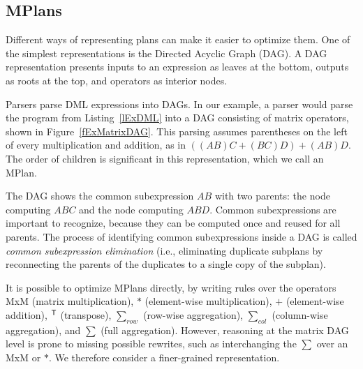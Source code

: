 \subsection{MPlans}
Different ways of representing plans can make it easier to optimize them.
One of the simplest representations is the Directed Acyclic Graph (DAG).
A DAG representation presents inputs to an expression as leaves at the bottom, outputs as roots at the top, and operators as interior nodes.

Parsers parse DML expressions into DAGs.
In our example, a parser would parse the program from Listing~\ref{lExDML} into a DAG consisting of matrix operators, shown in Figure~\ref{fExMatrixDAG}.
This parsing assumes parentheses on the left of every multiplication and addition, as in $((AB)C + (BC)D) + (AB)D$.
The order of children is significant in this representation, which we call an MPlan.

The DAG shows the common subexpression $AB$ with two parents: the node computing $ABC$ and the node computing $ABD$.
Common subexpressions are important to recognize, because they can be computed once and reused for all parents.
The process of identifying common subexpressions inside a DAG is called \textit{common subexpression elimination} (i.e., eliminating duplicate subplans by reconnecting the parents of the duplicates to a single copy of the subplan).

It is possible to optimize MPlans directly, by writing rules over the operators MxM (matrix multiplication), $*$ (element-wise multiplication), $+$ (element-wise addition), $^{\mathsf{T}}$ (transpose), $\sum_{row}$ (row-wise aggregation), $\sum_{col}$ (column-wise aggregation), and $\sum$ (full aggregation).
However, reasoning at the matrix DAG level is prone to missing possible rewrites,
such as interchanging the $\sum$ over an MxM or $*$.
We therefore consider a finer-grained representation.


